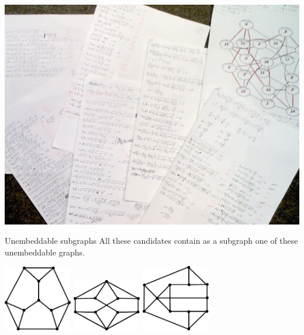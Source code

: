 \documentclass{beamer}
\begin{document}
\begin{frame}
    \includegraphics[width=\textwidth]{../graphs/manual.jpg}
\end{frame}

\begin{frame}{Unembeddable subgraphs}
    All these candidates contain as a subgraph one of these
    unembeddable graphs.
    \begin{center}
    \includegraphics[width=3cm]{../graphs/unemb10-1.pdf}\qquad
    \includegraphics[width=3cm]{../graphs/unemb10-2.pdf}\qquad
    \includegraphics[width=3cm]{../graphs/unemb10-3.pdf}
    \end{center}
\end{frame}
\end{document}
